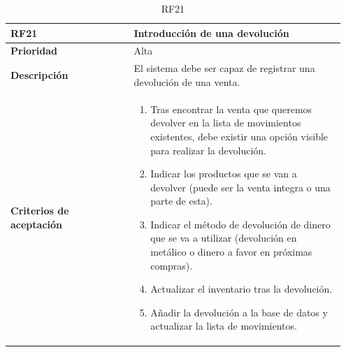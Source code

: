 \begin{table}[H]
	\centering %
	\begin{tabular}{|p{0.35\linewidth}|p{0.6\linewidth}|}
		\hline
		\rowcolor{grayshade} \textbf{RF21} & \textbf{Introducción de una devolución} \\
		\hline
		\textbf{Prioridad} & Alta \\
		\hline
		\textbf{Descripción} & El sistema debe ser capaz de registrar una devolución de una venta.\\
		\hline
		\vspace{0.5mm}
		\textbf{Criterios de aceptación} & 
		\begin{minipage}[t]{0.9\linewidth}
			\begin{enumerate}
				\item Tras encontrar la venta que queremos devolver en la lista de movimientos existentes, debe existir una opción visible para realizar la devolución.
				\item Indicar los productos que se van a devolver (puede ser la venta integra o una parte de esta).
				\item Indicar el método de devolución de dinero que se va a utilizar (devolución en metálico o dinero a favor en próximas compras).
				\item Actualizar el inventario tras la devolución. 
				\item Añadir la devolución a la base de datos y actualizar la lista de movimientos.  
			\end{enumerate}
			\vspace{2mm}
		\end{minipage} \\
		\hline
	\end{tabular}
	\caption{RF21}
\end{table}


